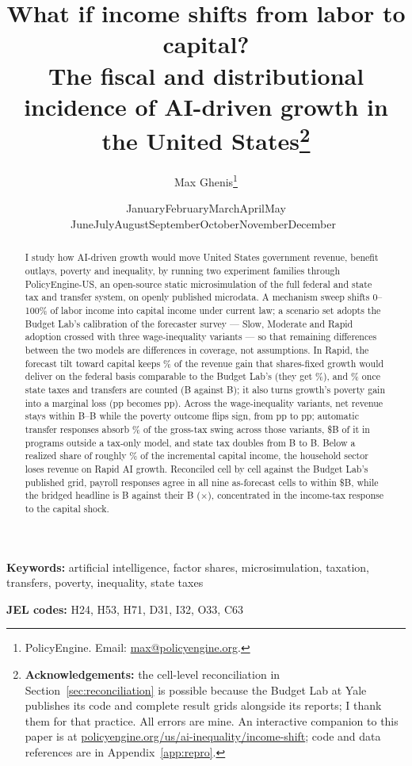 \documentclass[11pt]{article}
\title{\bfseries What if income shifts from labor to capital?\\[0.15cm]
The fiscal and distributional incidence of AI-driven growth in the United
States\thanks{\textbf{Acknowledgements:} the cell-level reconciliation in
Section~\ref{sec:reconciliation} is possible because the Budget Lab at Yale
publishes its code and complete result grids alongside its reports; I thank
them for that practice. All errors are mine. An interactive companion to this
paper is at
\href{https://policyengine.org/us/ai-inequality/income-shift}{policyengine.org/us/ai-inequality/income-shift};
code and data references are in Appendix~\ref{app:repro}.}\\[0.7cm]}
\author{Max Ghenis\thanks{PolicyEngine. Email:
\href{mailto:max@policyengine.org}{max@policyengine.org}.}}
\date{\small \ifcase\month\or January\or February\or March\or April\or May\or
June\or July\or August\or September\or October\or November\or December\fi\
\the\year}
\begin{document}
\maketitle

\begin{abstract}
\noindent I study how AI-driven growth would move United States government
revenue, benefit outlays, poverty and inequality, by running two experiment
families through PolicyEngine-US, an open-source static microsimulation of the
full federal and state tax and transfer system, on openly published microdata.
A mechanism sweep shifts 0--100\% of labor income into capital income under
current law; a scenario set adopts the Budget Lab's calibration of the
\citet{karger2026} forecaster survey --- Slow, Moderate and Rapid adoption
crossed with three wage-inequality variants --- so that remaining differences
between the two models are differences in coverage, not assumptions. In Rapid,
the forecast tilt toward capital keeps \genKeptMatchedRapidPct\% of the
revenue gain that shares-fixed growth would deliver on the federal basis
comparable to the Budget Lab's (they get \genKeptTheirsRapidPct\%), and
\genKeptHouseholdRapidPct\% once state taxes and transfers are counted
(\genRapidPropRev B against \genRapidFixedRev B); it also turns growth's
poverty gain into a marginal loss (\genRapidFixedPovPp pp becomes
\genRapidPropPovPp pp). Across the wage-inequality variants, net revenue
stays within \genRapidCompRev B--\genRapidExpRev B while the poverty outcome
flips sign, from \genRapidCompPovPp pp to \genRapidExpPovPp pp; automatic
transfer responses absorb \genTransferAbsorbPct\% of the gross-tax swing
across those variants, \$\genBenefitSwing B of it in programs outside a
tax-only model, and state tax doubles from \genRapidCompState B to
\genRapidExpState B. Below a realized share of roughly
\genRealBreakevenPct\% of the incremental capital income, the household
sector loses revenue on Rapid AI growth. Reconciled cell by cell against the
Budget Lab's published grid, payroll responses agree in all nine as-forecast
cells to within \$\genPayrollMaxCellGap B, while the bridged headline is
\genBridgeOursTotal B against their \genBridgeTheirsTotal B
(\genBridgeRatio$\times$), concentrated in the income-tax response to the
capital shock.
\end{abstract}

\medskip
\noindent\textbf{Keywords:} artificial intelligence, factor shares,
microsimulation, taxation, transfers, poverty, inequality, state taxes

\medskip
\noindent\textbf{JEL codes:} H24, H53, H71, D31, I32, O33, C63

\newpage








\clearpage

\clearpage
\appendix

\end{document}
